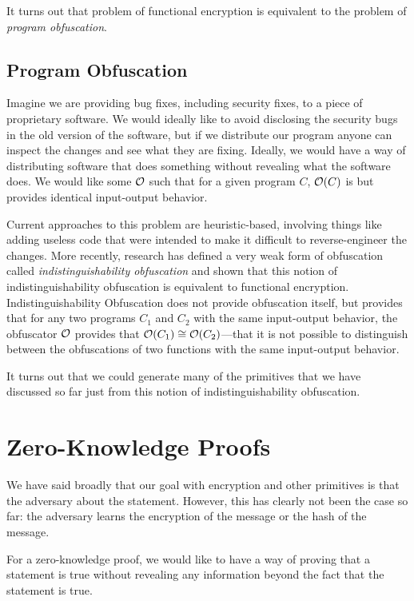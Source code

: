 It turns out that problem of functional encryption is equivalent to the problem of \emph{program obfuscation}.
\subsection{Program Obfuscation}
Imagine we are providing bug fixes, including security fixes, to a piece of proprietary software. We would ideally like to avoid disclosing the security bugs in the old version of the software, but if we distribute our program anyone can inspect the changes and see what they are fixing. Ideally, we would have a way of distributing software that does something without revealing what the software does. We would like some  $\mathcal{O}$ such that for a given program $C$, $\mathcal{O}(C)$ is  but provides identical input-output behavior.

Current approaches to this problem are heuristic-based, involving things like adding useless code that were intended to make it difficult to reverse-engineer the changes. More recently, research has defined a very weak form of obfuscation called \emph{indistinguishability obfuscation} and shown that this notion of indistinguishability obfuscation is equivalent to functional encryption. Indistinguishability Obfuscation does not provide obfuscation itself, but provides that for any two programs $C_1$ and $C_2$ with the same input-output behavior, the obfuscator $\mathcal{O}$ provides that $\mathcal{O}(C_1) \cong \mathcal{O}(C_2)$---that it is not possible to distinguish between the obfuscations of two functions with the same input-output behavior.

It turns out that we could generate many of the primitives that we have discussed so far just from this notion of indistinguishability obfuscation.


\section{Zero-Knowledge Proofs}
We have said broadly that our goal with encryption and other primitives is that the adversary  about the statement. However, this has clearly not been the case so far: the adversary learns the encryption of the message or the hash of the message. 

For a zero-knowledge proof, we would like to have a way of proving that a statement is true without revealing any information beyond the fact that the statement is true.

